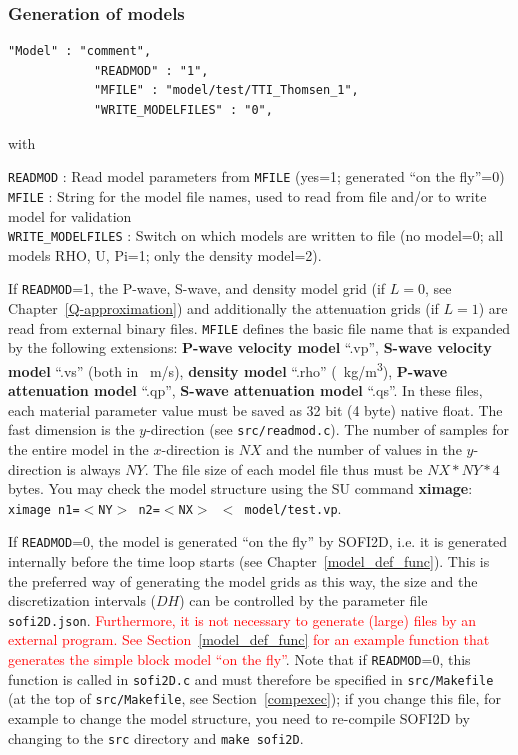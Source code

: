 \subsubsection{Generation of models}
\label{gen_of_mod}
\begin{verbatim}
"Model" : "comment",
            "READMOD" : "1",
            "MFILE" : "model/test/TTI_Thomsen_1",
            "WRITE_MODELFILES" : "0",
\end{verbatim}

with

\texttt{READMOD} : Read model parameters from \texttt{MFILE} (yes=1; generated \enquote{on the fly}=0)\\
\texttt{MFILE} : String for the model file names, used to read from file and/or to write model for validation\\
\texttt{WRITE\_MODELFILES} : Switch on which models are written to file (no model=0; all models RHO, U, Pi=1; only the density model=2).

If \texttt{READMOD}=1, the P-wave, S-wave, and density model grid (if $L=0$, see Chapter~\ref{Q-approximation}) and additionally the attenuation grids (if $L=1$) are read from external binary files. \texttt{MFILE} defines the basic file name that is expanded by the following extensions: \textbf{P-wave velocity model} \enquote{.vp}, \textbf{S-wave velocity model} \enquote{.vs} (both in \SI{}{m/s}), \textbf{density model} \enquote{.rho} (\SI{}{kg/m^3}), \textbf{P-wave attenuation model} \enquote{.qp}, \textbf{S-wave attenuation model} \enquote{.qs}. In these files, each material parameter value must be saved as 32 bit (4 byte) native float. The fast dimension is the $y$-direction (see \texttt{src/readmod.c}). The number of samples for the entire model in the $x$-direction is $NX$ and the number of values in the $y$-direction is always $NY$. The file size of each model file thus must be $NX*NY*4$ bytes. You may check the model structure using the SU command \textbf{ximage}: \texttt{ximage n1=$<$NY$>$ n2=$<$NX$>$ $<$ model/test.vp}.

If \texttt{READMOD}=0, the model is generated \enquote{on the fly} by SOFI2D, i.e. it is generated internally before the time loop starts (see Chapter~\ref{model_def_func}). This is the preferred way of generating the model grids as this way, the size and the discretization intervals ($DH$) can be controlled by the parameter file \texttt{sofi2D.json}. \textcolor{red}{Furthermore, it is not necessary to generate (large) files by an external program. See Section~\ref{model_def_func} for an example function that generates the simple block model \enquote{on the fly}}. Note that if \texttt{READMOD}=0, this function is called in \texttt{sofi2D.c} and must therefore be specified in \texttt{src/Makefile} (at the top of \texttt{src/Makefile}, see Section~\ref{compexec}); if you change this file, for example to change the model structure, you need to re-compile SOFI2D by changing to the \texttt{src} directory and \texttt{make sofi2D}.

